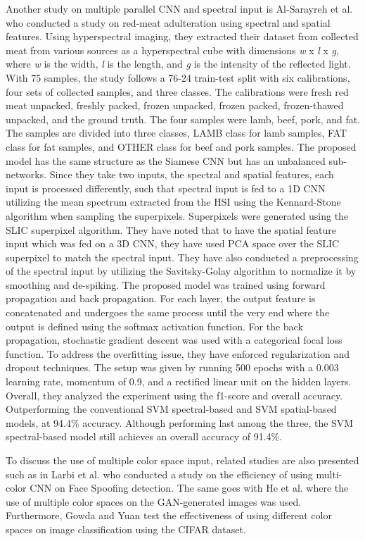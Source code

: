 Another study on multiple parallel CNN and spectral input is Al-Sarayreh et al. \cite{al-sarayreh-2018} who conducted a study on red-meat adulteration using spectral and spatial features. Using hyperspectral imaging, they extracted their dataset from collected meat from various sources as a hyperspectral cube with dimensions \textit{w} x \textit{l} x \textit{g}, where \textit{w} is the width, \textit{l} is the length, and \textit{g} is the intensity of the reflected light. With 75 samples, the study follows a 76-24 train-test split with six calibrations, four sets of collected samples, and three classes. The calibrations were fresh red meat unpacked, freshly packed, frozen unpacked, frozen packed, frozen-thawed unpacked, and the ground truth. The four samples were lamb, beef, pork, and fat. The samples are divided into three classes, LAMB class for lamb samples, FAT class for fat samples, and OTHER class for beef and pork samples. The proposed model has the same structure as the Siamese CNN but has an unbalanced sub-networks. Since they take two inputs, the spectral and spatial features, each input is processed differently, such that spectral input is fed to a 1D CNN utilizing the mean spectrum extracted from the HSI using the Kennard-Stone algorithm when sampling the superpixels. Superpixels were generated using the SLIC superpixel algorithm. They have noted that to have the spatial feature input which was fed on a 3D CNN, they have used PCA space over the SLIC superpixel to match the spectral input. They have also conducted a preprocessing of the spectral input by utilizing the Savitsky-Golay algorithm to normalize it by smoothing and de-spiking. The proposed model was trained using forward propagation and back propagation. For each layer, the output feature is concatenated and undergoes the same process until the very end where the output is defined using the softmax activation function. For the back propagation, stochastic gradient descent was used with a categorical focal loss function. To address the overfitting issue, they have enforced regularization and dropout techniques. The setup was given by running 500 epochs with a 0.003 learning rate, momentum of 0.9, and a rectified linear unit on the hidden layers. Overall, they analyzed the experiment using the f1-score and overall accuracy. Outperforming the conventional SVM spectral-based and SVM spatial-based models, at 94.4\% accuracy. Although performing last among the three, the SVM spectral-based model still achieves an overall accuracy of 91.4\%.

To discuss the use of multiple color space input, related studies are also presented such as in Larbi et al. \cite{larbi-2018} who conducted a study on the efficiency of using multi-color CNN on Face Spoofing detection. The same goes with He et al.\cite{he-2019} where the use of multiple color spaces on the GAN-generated images was used. Furthermore, Gowda and Yuan \cite{gowda-2019} test the effectiveness of using different color spaces on image classification using the CIFAR dataset.

